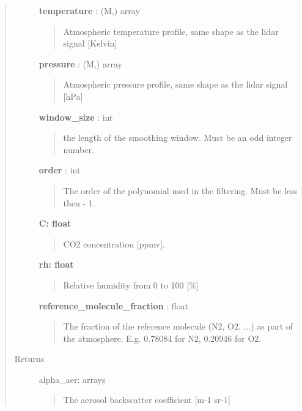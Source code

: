 \documentclass[letterpaper,10pt,english]{sphinxmanual}
\begin{document}
\begin{fulllineitems}
\begin{quote}
\begin{description}
\textbf{temperature} : (M,) array
\begin{quote}

Atmospheric temperature profile, same shape as the lidar signal {[}Kelvin{]}
\end{quote}

\textbf{pressure} : (M,) array
\begin{quote}

Atmospheric pressure profile, same shape as the lidar signal {[}hPa{]}
\end{quote}

\textbf{window\_size} : int
\begin{quote}

the length of the smoothing window. Must be an odd integer number.
\end{quote}

\textbf{order} : int
\begin{quote}

The order of the polynomial used in the filtering.
Must be less then  - 1.
\end{quote}

\textbf{C: float}
\begin{quote}

CO2 concentration {[}ppmv{]}.
\end{quote}

\textbf{rh: float}
\begin{quote}

Relative humidity from 0 to 100 {[}\%{]}
\end{quote}

\textbf{reference\_molecule\_fraction} : float
\begin{quote}

The fraction of the reference molecule (N2, O2, ...) as part of the atmosphere.
E.g. 0.78084 for N2, 0.20946 for O2.
\end{quote}

\item[{Returns}] \leavevmode
alpha\_aer: arrays
\begin{quote}

The aerosol backscatter coefficient {[}m-1 sr-1{]}
\end{quote}

\end{description}\end{quote}

\end{fulllineitems}

\end{document}

